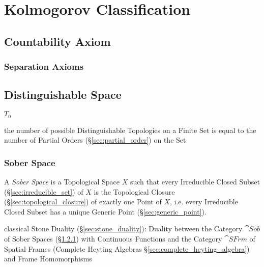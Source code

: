 \section{Kolmogorov Classification}\label{sec:kolmogorov_classification}

\subsection{Countability Axiom}\label{sec:countability_axiom}

\subsubsection{Separation Axioms}\label{sec:separation_axioms}



\subsection{Distinguishable Space}\label{sec:distinguishable_space}

$\xspace{T}_0$

the number of possible Distinguishable Topologies on a Finite Set is equal to
the number of Partial Orders (\S\ref{sec:partial_order}) on the Set



\subsubsection{Sober Space}\label{sec:sober_space}

A \emph{Sober Space} is a Topological Space $X$ such that every Irreducible
Closed Subset (\S\ref{sec:irreducible_set}) of $X$ is the Topological Closure
(\S\ref{sec:topological_closure}) of exactly one Point of $X$, i.e. every
Irreducible Closed Subset has a unique Generic Point
(\S\ref{sec:generic_point}).

classical Stone Duality (\S\ref{sec:stone_duality}): Duality between the
Category $\cat{Sob}$ of Sober Spaces (\S\ref{sec:sober_space}) with Continuous
Functions and the Category $\cat{SFrm}$ of Spatial Frames (Complete Heyting
Algebras \S\ref{sec:complete_heyting_algebra}) and Frame Homomorphisms



